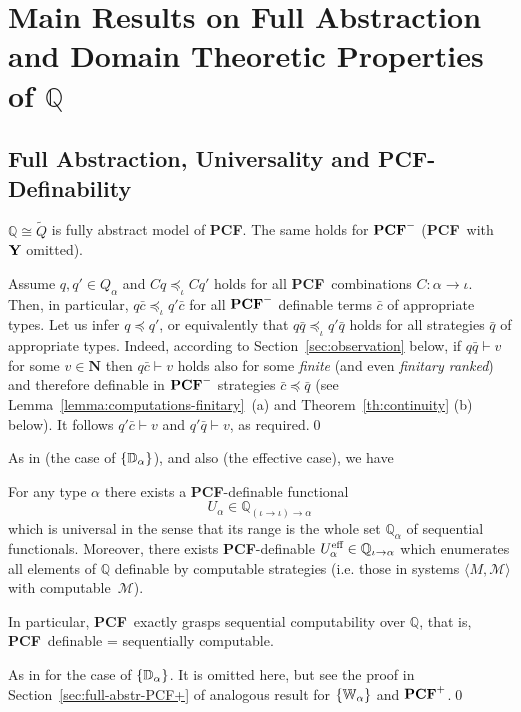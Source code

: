\documentclass[fleqn]{LMCS}
\theoremstyle{plain}\newtheorem{satz}[thm]{Satz}
\theoremstyle{plain}\newtheorem{hyp}[thm]{Hypothesis}
\theoremstyle{plain}\newtheorem{hyps}[thm]{Hypotheses}
\theoremstyle{definition}\newtheorem{note}[thm]{Note}
\newcommand{\setof}[1]{\{#1\}}
\newcommand{\arr}{\rightarrow}
\newcommand{\la}{\langle}
\newcommand{\ra}{\rangle}
\newcommand{\tuple}[1]{\la #1 \ra}
\newcommand{\NN}{\mathbf{N}}
\newcommand{\bbQ}{\mathbb{Q}}
\newcommand{\PCF}{\mbox{\bf PCF}}
\newcommand{\Y}{\mbox{\bf Y}}
\newcommand{\MM}{{\mathcal M}}
\newcommand{\bc}{\bar{c}}
\newcommand{\bq}{\bar{q}}
\newcommand{\tQ}{\tilde{Q}}
\newcommand{\lee}{\preceq}
\newcommand{\?}{\mbox{?}}
\begin{document}
\section{Main Results on Full Abstraction and Domain Theoretic Properties 
of \texorpdfstring{$\bbQ$}{Q}}
\label{sec:full-abs}


\subsection{Full Abstraction, Universality and 
\texorpdfstring{\PCF}{PCF}-Definability}
\label{sec:main-res}


\begin{thm}\label{th:full-abstr}
$\bbQ\cong\tQ$ is fully abstract model of\/ \PCF. 
The same holds for $\PCF^-$ (\PCF\ with $\Y$ omitted). 
\end{thm}
\proof 
Assume $q,q'\in Q_\alpha$ and $Cq\lee_\iota Cq'$ holds 
for all \PCF\ combinations $C:\alpha\arr\iota$. Then, in particular, 
$q\bc\lee_\iota q'\bc$ for all $\PCF^-$ definable terms $\bc$ 
of appropriate types. Let us infer $q\lee q'$, or equivalently 
that $q\bq\lee_\iota q'\bq$ holds for all strategies $\bq$ of appropriate types. 
Indeed, according to Section~\ref{sec:observation} below, 
if $q\bq\vdash v$ for some $v\in\NN$ then $q\bc\vdash v$ holds also 
for some \emph{finite} (and even \emph{finitary ranked}) and 
therefore definable in $\PCF^-$ strategies $\bc\lee\bq$ 
(see Lemma~\ref{lemma:computations-finitary}~(a) 
and Theorem~\ref{th:continuity} (b) below). 
It follows $q'\bc\vdash v$ and $q'\bq\vdash v$, as required.\qed


\noindent
As in \cite{Saz76AL} (the case of $\setof{\bbD_\alpha}$), 
\cite{Abramsky-Jagadeesan2000,Hyland-Ong2000} 
and also \cite{Longley-Plotkin} (the effective case), we have
\begin{thm}\label{th:universal}
For any type $\alpha$ there exists a\/ \PCF-definable functional
\[
U_{\alpha}\in \bbQ_{(\iota\arr \iota)\arr \alpha}
\]
which is universal in the
sense that its range is the whole set $\bbQ_{\alpha}$ of sequential 
functionals. Moreover, there
exists\/ \PCF-definable
$U^{\mbox{\scriptsize\rm eff}}_{\alpha}\in \bbQ_{\iota\arr \alpha}$
which enumerates all elements of $\bbQ$ definable by
computable strategies (i.e. those in systems $\tuple{M,\MM}$
with computable~$\MM$).

In particular,\/ \PCF\ exactly grasps sequential computability over $\bbQ$, 
that is, \PCF\ definable = sequentially computable. 
\end{thm}
\proof  As in \cite{Saz76AL} for the case of 
$\setof{\bbD_\alpha}$. It is omitted here, but see the proof 
in Section~\ref{sec:full-abstr-PCF+} 
of analogous result for $\setof{\bbW_\alpha}$ and $\PCF^+$.\qed
\end{document}
